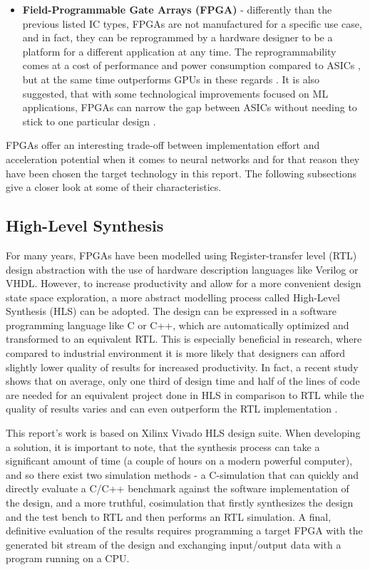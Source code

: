 \begin{itemize}
  \item \textbf{Field-Programmable Gate Arrays (FPGA)} - differently than the previous listed IC types, FPGAs are not manufactured for a specific use case, and in fact, they can be reprogrammed by a hardware designer to be a platform for a different application at any time. The reprogrammability comes at a cost of performance and power consumption compared to ASICs \cite{25-boutros2018improve}, but at the same time outperforms GPUs in these regards \cite{27-nurvitadhi2017fpgas, 28-li2018gpu-outperforming}. It is also suggested, that with some technological improvements focused on ML applications, FPGAs can narrow the gap between ASICs without needing to stick to one particular design \cite{25-boutros2018improve, 26-nurvitadhi2016accelerating, 15-nurvitadhi2016accelerating}.

\end{itemize}

FPGAs offer an interesting trade-off between implementation effort and acceleration potential when it comes to neural networks and for that reason they have been chosen the target technology in this report. The following subsections give a closer look at some of their characteristics.

\subsection{High-Level Synthesis}
For many years, FPGAs have been modelled using Register-transfer level (RTL) design abstraction with the use of hardware description languages like Verilog or VHDL. However, to increase productivity and allow for a more convenient design state space exploration, a more abstract modelling process called High-Level Synthesis (HLS) can be adopted. The design can be expressed in a software programming language like C or C++, which are automatically optimized and transformed to an equivalent RTL. This is especially beneficial in research, where compared to industrial environment it is more likely that designers can afford slightly lower quality of results for increased productivity. In fact, a recent study shows that on average, only one third of design time and half of the lines of code are needed for an equivalent project done in HLS in comparison to RTL while the quality of results varies and can even outperform the RTL implementation \cite{30-lahti2019yet?}.

This report's work is based on Xilinx Vivado HLS design suite. When developing a solution, it is important to note, that the synthesis process can take a significant amount of time (a couple of hours on a modern powerful computer), and so there exist two simulation methods - a C-simulation that can quickly and directly evaluate a C/C++ benchmark against the software implementation of the design, and a more truthful, cosimulation that firstly synthesizes the design and the test bench to RTL and then performs an RTL simulation. A final, definitive evaluation of the results requires programming a target FPGA with the generated bit stream of the design and exchanging input/output data with a program running on a CPU.


